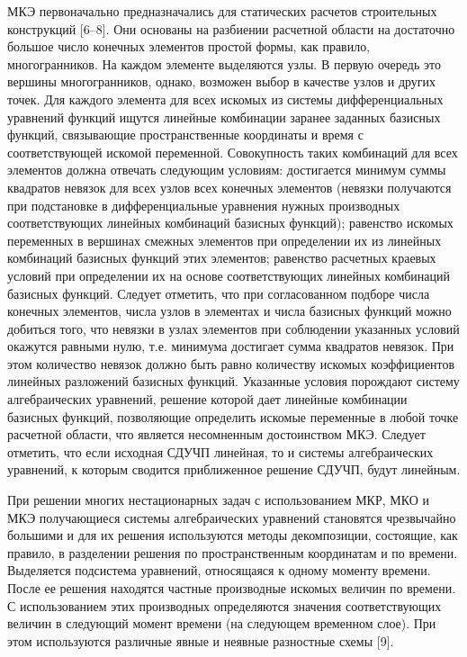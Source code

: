 \documentclass[a4paper,11pt,numreferences,mathsec,kaplist]{isuepsutf8}
\begin{document}
\begin{article}
МКЭ первоначально предназначались для статических расчетов
строительных конструкций [6--8]. Они основаны на разбиении расчетной
области на достаточно большое число конечных элементов простой формы,
как правило, многогранников.  На каждом элементе выделяются узлы. В
первую очередь это вершины многогранников, однако, возможен выбор в
качестве узлов и других точек. Для каждого элемента для всех искомых
из системы дифференциальных уравнений функций ищутся линейные
комбинации заранее заданных базисных функций, связывающие
пространственные координаты и время с соответствующей искомой
переменной. Совокупность таких комбинаций для всех элементов должна
отвечать следующим условиям: достигается минимум суммы квадратов
невязок для всех узлов всех конечных элементов (невязки получаются при
подстановке в дифференциальные уравнения нужных производных
соответствующих линейных комбинаций базисных функций); равенство
искомых переменных в вершинах смежных элементов при определении их из
линейных комбинаций базисных функций этих элементов; равенство
расчетных краевых условий при определении их на основе соответствующих
линейных комбинаций базисных функций. Следует отметить, что при
согласованном подборе числа конечных элементов, числа узлов в
элементах и числа базисных функций можно добиться того, что невязки в
узлах элементов при соблюдении указанных условий окажутся равными
нулю, т.е. минимума достигает сумма квадратов невязок.
При этом количество невязок должно быть равно количеству
искомых коэффициентов линейных разложений базисных функций.  Указанные
условия порождают систему алгебраических уравнений, решение которой
дает линейные комбинации базисных функций, позволяющие определить
искомые переменные в любой точке расчетной области, что является
несомненным достоинством МКЭ. Следует отметить, что если исходная
СДУЧП линейная, то и системы алгебраических уравнений, к которым
сводится приближенное решение СДУЧП, будут линейным.

При решении многих нестационарных задач с использованием МКР, МКО и
МКЭ получающиеся системы алгебраических уравнений становятся
чрезвычайно большими и для их решения используются методы
декомпозиции, состоящие, как правило, в разделении решения по
пространственным координатам и по времени.  Выделяется подсистема
уравнений, относящаяся к одному моменту времени.  После ее решения
находятся частные производные искомых величин по времени.  С
использованием этих производных определяются значения соответствующих
величин в следующий момент времени (на следующем временном слое). При
этом используются различные явные и неявные разностные схемы [9].


\end{article}
\end{document}

